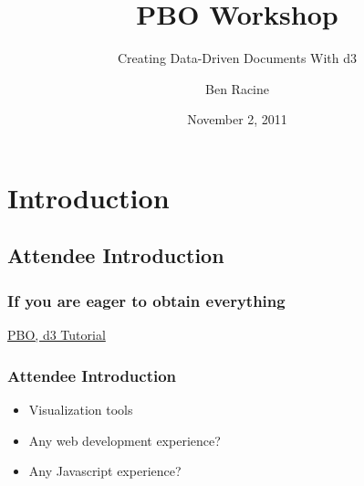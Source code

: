 \documentclass{beamer}
\title{PBO Workshop}
\subtitle{Creating Data-Driven Documents With d3}
\author{Ben Racine \inst{1} }
\institute{\inst{1} Cornerstone Systems NW }
\date{November 2, 2011}
\begin{document}
\begin{frame}
    \frametitle{}
    \titlepage
\end{frame}






\section{Introduction}


\subsection{Attendee Introduction}


\begin{frame}
    \frametitle{If you are eager to obtain everything}
    \href{https://github.com/benracine/d3_cisnet_tutorial/downloads}{PBO, d3 Tutorial}
\end{frame}


\begin{frame}
    \frametitle{Attendee Introduction}
\pause
    \begin{itemize}
\pause
    \item Visualization tools
\pause
    \item Any web development experience?
\pause
    \item Any Javascript experience?
\pause
    \end{itemize}
\end{frame}
\end{document}
